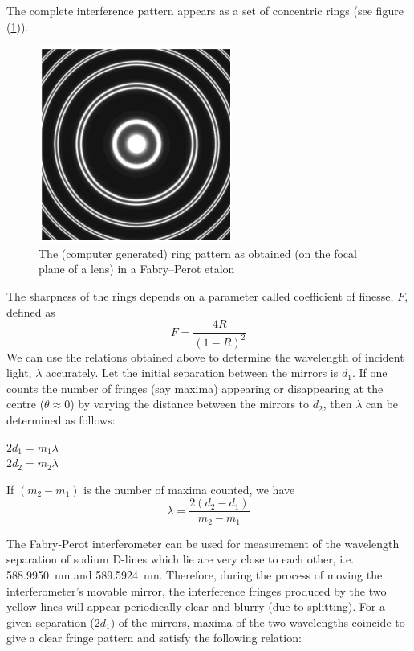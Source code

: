 \documentclass{article}
\begin{document}
\noindent
The complete interference pattern appears as a set of concentric rings (see figure (\ref{fig:cgrings})). 
\begin{figure}[h!]
    \centering
    \captionsetup{justification=centering}
    \includegraphics[scale = 1]{Figures/cgrings.png}
    \caption{The (computer generated) ring pattern as obtained (on the focal plane of a lens) in a Fabry–Perot etalon}
    \label{fig:cgrings}
\end{figure}
\par
\noindent
The sharpness of the rings depends on a parameter called coefficient of finesse, $F$, defined as
\begin{equation}
    F = \dfrac{4R}{(1 - R)^2}
\end{equation}
\noindent
We can use the relations obtained above to determine the wavelength of incident light, $\lambda$ accurately. Let the initial separation between the mirrors is $d_1$. If one counts the number of fringes (say maxima) appearing or disappearing at the centre ($\theta \approx 0$) by varying the distance between the mirrors to $d_2$, then $\lambda$ can be determined as follows:
\begin{center}
    $2 d_1 = m_1 \lambda$\\
    $2 d_2 = m_2 \lambda$
\end{center}
If $(m_2 - m_1)$ is the number of maxima counted, we have
\begin{equation}
    \boxed{\lambda = \dfrac{2 (d_2 - d_1)}{m_2 - m_1}}
\end{equation}
\par
\noindent
The Fabry-Perot interferometer can be used for measurement of the wavelength separation of sodium 
D-lines which lie are very close to each other, i.e. \SI{588.9950}{\nano \metre}  and \SI{589.5924}{\nano \metre}. Therefore, during the process of moving the interferometer's movable mirror, the interference fringes produced by the two yellow lines will appear periodically clear and blurry (due to splitting). For a given separation ($2 d_1$) of the mirrors, maxima of the two wavelengths coincide to give a clear fringe pattern and satisfy the following relation:
\end{document}
